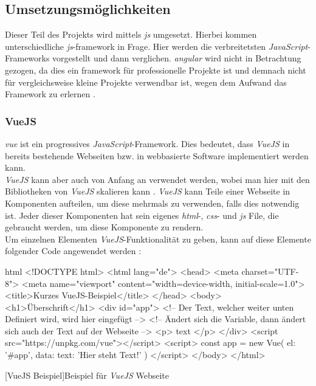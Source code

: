 \subsection{Umsetzungsmöglichkeiten}
Dieser Teil des Projekts wird mittels \textit{\Gls{js}} umgesetzt. Hierbei kommen unterschiedliche \textit{\Gls{js}}-\Gls{framework} in Frage. Hier werden die verbreitetsten \textit{JavaScript}-Frameworks vorgestellt und dann verglichen. \textit{\Gls{angular}} wird nicht in Betrachtung gezogen, da dies ein \Gls{framework} für professionelle Projekte ist und demnach nicht für vergleichsweise kleine Projekte verwendbar ist, wegen dem Aufwand das Framework zu erlernen \cite{angular_ex}.
\subsubsection{VueJS}
\textit{\Gls{vue}} ist ein progressives \textit{JavaScript}-Framework. Dies bedeutet, dass \textit{VueJS} in bereits bestehende Webseiten bzw. in webbasierte Software implementiert werden kann.\\
\textit{VueJS} kann aber auch von Anfang an verwendet werden, wobei man hier mit den Bibliotheken von \textit{VueJS} skalieren kann \cite{vuedoc}. \textit{VueJS} kann Teile einer Webseite in Komponenten aufteilen, um diese mehrmals zu verwenden, falls dies notwendig ist. Jeder dieser Komponenten hat sein eigenes \textit{\Gls{html}}-, \textit{\Gls{css}}- und \textit{\Gls{js}} File, die gebraucht werden, um diese Komponente zu rendern.\\
Um einzelnen Elementen \textit{VueJS}-Funktionalität zu geben, kann auf diese Elemente folgender Code angewendet werden \cite{vuedoc}:
\begin{code}{html}
	<!DOCTYPE html>
	<html lang="de">
		<head>
			<meta charset="UTF-8">
			<meta name="viewport" content="width=device-width, initial-scale=1.0">
			<title>Kurzes VueJS-Beispiel</title>
		</head>
		<body>
			<h1>Überschrift</h1>
			<div id="app">
				<!-- Der Text, welcher weiter unten Definiert wird, wird hier eingefügt -->
				<!-- Ändert sich die Variable, dann ändert sich auch der Text auf der Webseite -->
				<p> {{ text }} </p>
			</div>
			<script src="https://unpkg.com/vue"></script>
			<script>
				const app = new Vue({
					el: '#app',
					data: {
						text: 'Hier steht Text!'
					}
				})
			</script>
		</body>
	</html>
\end{code}
[VueJS Beispiel]{Beispiel für \textit{VueJS} Webseite}~\\
